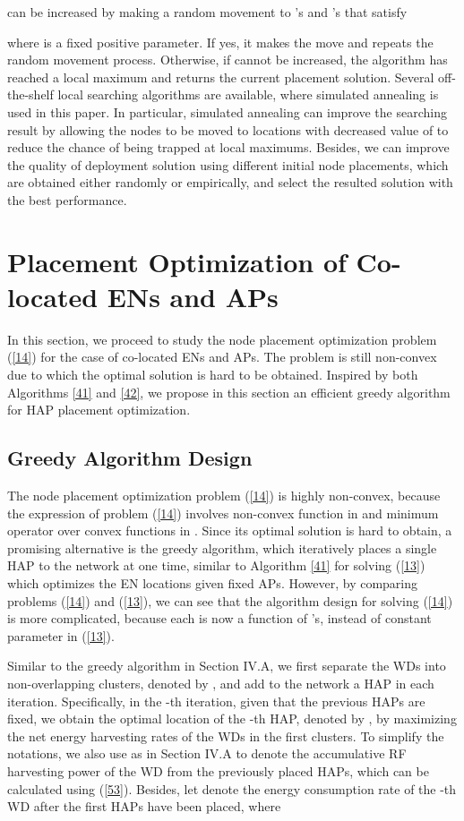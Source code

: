 \documentclass[journal, draftcls, one column, 12pt]{IEEEtran}
\begin{document}
can be increased by making a random movement to 's and 's that satisfy

where  is a fixed positive parameter. If yes, it makes the move and repeats the random movement process. Otherwise, if  cannot be increased, the algorithm has reached a local maximum and returns the current placement solution. Several off-the-shelf local searching algorithms are available, where simulated annealing \cite{2010:Hromkovic} is used in this paper. In particular, simulated annealing can improve the searching result by allowing the nodes to be moved to locations with decreased value of  to reduce the chance of being trapped at local maximums. Besides, we can improve the quality of deployment solution using different initial node placements, which are obtained either randomly or empirically, and select the resulted solution with the best performance.

\section{Placement Optimization of Co-located ENs and APs}
In this section, we proceed to study the node placement optimization problem (\ref{14}) for the case of co-located ENs and APs. The problem is still non-convex due to which the optimal solution is hard to be obtained. Inspired by both Algorithms \ref{41} and \ref{42}, we propose in this section an efficient greedy algorithm for HAP placement optimization.

\subsection{Greedy Algorithm Design}
The node placement optimization problem (\ref{14}) is highly non-convex, because the expression of problem (\ref{14}) involves non-convex function  in  and minimum operator over convex functions in . Since its optimal solution is hard to obtain, a promising alternative is the greedy algorithm, which iteratively places a single HAP to the network at one time, similar to Algorithm \ref{41} for solving (\ref{13}) which optimizes the EN locations given fixed APs. However, by comparing problems (\ref{14}) and (\ref{13}), we can see that the algorithm design for solving (\ref{14}) is more complicated, because each  is now a function of 's, instead of constant parameter in (\ref{13}).

Similar to the greedy algorithm in Section IV.A, we first separate the  WDs into  non-overlapping clusters, denoted by , and add to the network a HAP in each iteration. Specifically, in the -th iteration, given that the previous  HAPs are fixed, we obtain the optimal location of the -th HAP, denoted by , by maximizing the net energy harvesting rates of the WDs in the first  clusters. To simplify the notations, we also use  as in Section IV.A to denote the accumulative RF harvesting power of the WD  from the previously placed  HAPs, which can be calculated using (\ref{53}). Besides, let  denote the energy consumption rate of the -th WD after the first  HAPs have been placed, where
\end{document}
